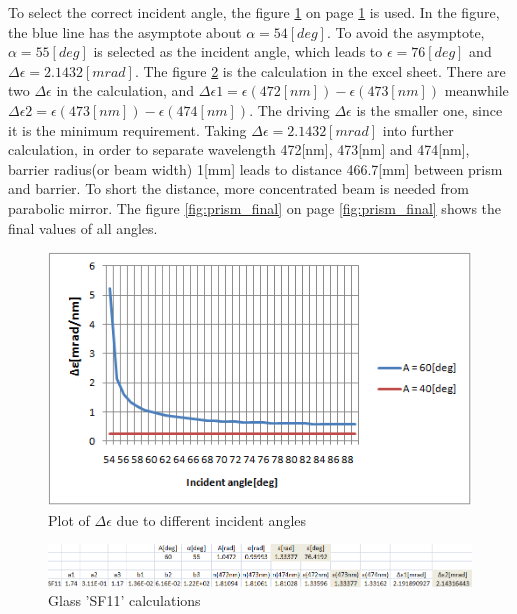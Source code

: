To select the correct incident angle, the figure \ref{fig:prism_alpha} on page \ref{fig:prism_alpha} is used. In the figure, the blue line has the asymptote about $\alpha = 54[deg]$. To avoid the asymptote, $\alpha = 55[deg]$ is selected as the incident angle, which leads to $\epsilon = 76[deg]$ and $\Delta\epsilon = 2.1432[mrad]$. The figure \ref{fig:SF11} is the calculation in the excel sheet. There are two $\Delta\epsilon$ in the calculation, and $\Delta\epsilon1 = \epsilon(472[nm]) - \epsilon(473[nm])$ meanwhile $\Delta\epsilon2 = \epsilon(473[nm]) - \epsilon(474[nm])$. The driving $\Delta\epsilon$ is the smaller one, since it is the minimum requirement. Taking $\Delta\epsilon = 2.1432[mrad]$ into further calculation, in order to separate wavelength 472[nm], 473[nm] and 474[nm], barrier radius(or beam width) 1[mm] leads to distance 466.7[mm] between prism and barrier. To short the distance, more concentrated beam is needed from parabolic mirror. The figure \ref{fig:prism_final} on page \ref{fig:prism_final} shows the final values of all angles.

\begin{figure}[ht!]
\centering
\includegraphics[scale = 1.2]{chapters/img/prism_alpha.png}
\caption{Plot of $\Delta\epsilon$ due to different incident angles}
\label{fig:prism_alpha}
\end{figure}

\begin{figure}[ht!]
\centering
\includegraphics[scale = 0.8]{chapters/img/SF11.png}
\caption{Glass 'SF11' calculations}
\label{fig:SF11}
\end{figure}

